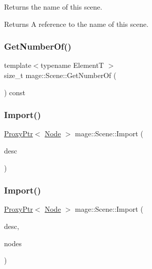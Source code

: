 Returns the name of this scene.

\begin{DoxyReturn}{Returns}
A reference to the name of this scene. 
\end{DoxyReturn}
\hypertarget{classmage_1_1_scene_a308480749d009dad3a39333fd0c59f2a}{}\label{classmage_1_1_scene_a308480749d009dad3a39333fd0c59f2a} 
\subsubsection{\texorpdfstring{Get\+Number\+Of()}{GetNumberOf()}}
{\footnotesize\ttfamily template$<$typename ElementT $>$ \\
size\+\_\+t mage\+::\+Scene\+::\+Get\+Number\+Of (\begin{DoxyParamCaption}{ }\end{DoxyParamCaption}) const\hspace{0.3cm}{\ttfamily [noexcept]}}

\hypertarget{classmage_1_1_scene_a4e503b8a952ec95ebd844ffde0b26e9f}{}\label{classmage_1_1_scene_a4e503b8a952ec95ebd844ffde0b26e9f} 
\subsubsection{\texorpdfstring{Import()}{Import()}\hspace{0.1cm}{\footnotesize\ttfamily [1/2]}}
{\footnotesize\ttfamily \hyperlink{classmage_1_1_proxy_ptr}{Proxy\+Ptr}$<$ \hyperlink{classmage_1_1_node}{Node} $>$ mage\+::\+Scene\+::\+Import (\begin{DoxyParamCaption}\item[{const \hyperlink{classmage_1_1_model_descriptor}{Model\+Descriptor} \&}]{desc }\end{DoxyParamCaption})}

\hypertarget{classmage_1_1_scene_ac7b2c61b6f46696905ddaf4251a13fdd}{}\label{classmage_1_1_scene_ac7b2c61b6f46696905ddaf4251a13fdd} 
\subsubsection{\texorpdfstring{Import()}{Import()}\hspace{0.1cm}{\footnotesize\ttfamily [2/2]}}
{\footnotesize\ttfamily \hyperlink{classmage_1_1_proxy_ptr}{Proxy\+Ptr}$<$ \hyperlink{classmage_1_1_node}{Node} $>$ mage\+::\+Scene\+::\+Import (\begin{DoxyParamCaption}\item[{const \hyperlink{classmage_1_1_model_descriptor}{Model\+Descriptor} \&}]{desc,  }\item[{std\+::vector$<$ \hyperlink{classmage_1_1_proxy_ptr}{Proxy\+Ptr}$<$ \hyperlink{classmage_1_1_node}{Node} $>$ $>$ \&}]{nodes }\end{DoxyParamCaption})}

